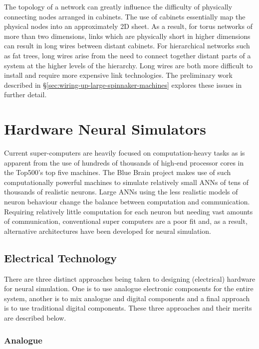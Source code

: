 			The topology of a network can greatly influence the difficulty of
			physically connecting nodes arranged in cabinets. The use of cabinets
			essentially map the physical nodes into an approximately 2D sheet. As a
			result, for torus networks of more than two dimensions, links which are
			physically short in higher dimensions can result in long wires between
			distant cabinets. For hierarchical networks such as fat trees, long wires
			arise from the need to connect together distant parts of a system at the
			higher levels of the hierarchy. Long wires are both more difficult to
			install and require more expensive link technologies. The preliminary work
			described in \S\ref{sec:wiring-up-large-spinnaker-machines} explores these
			issues in further detail.
	
	\section{Hardware Neural Simulators}
		
		Current super-computers are heavily focused on computation-heavy tasks as is
		apparent from the use of hundreds of thousands of high-end processor cores
		in the Top500's top five machines. The Blue Brain project \cite{markram06}
		makes use of such computationally powerful machines to simulate relatively
		small ANNs of tens of thousands of realistic neurons. Large ANNs using the
		less realistic models of neuron behaviour change the balance between
		computation and communication.  Requiring relatively little computation for
		each neuron but needing vast amounts of communication, conventional super
		computers are a poor fit and, as a result, alternative architectures have
		been developed for neural simulation.
		
		\subsection{Electrical Technology}
		
			There are three distinct approaches being taken to designing (electrical)
			hardware for neural simulation. One is to use analogue electronic components
			for the entire system, another is to mix analogue and digital components and
			a final approach is to use traditional digital components. These three
			approaches and their merits are described below.
			
			\subsubsection{Analogue}
			
